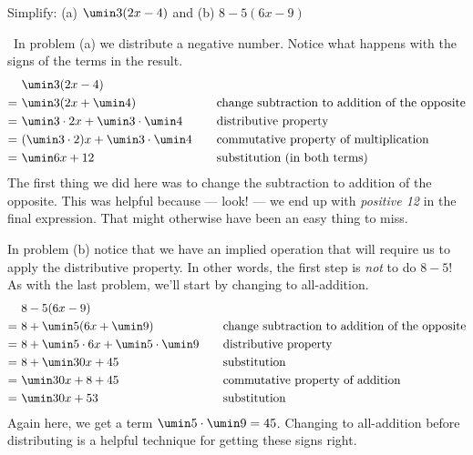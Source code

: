 \begin{boxedex}
Simplify: (a) $\umin3(2x - 4)$ \quad and \quad (b) $8-5(6x-9)$

\exsoln\ In problem (a) we distribute a negative number. Notice what happens with the signs of the terms in the result.
\[\begin{aligned}
&~ \umin3(2x - 4)&&\\
=&~ \umin3(2x + \umin4)
&& \quad \text{change subtraction to addition of the opposite}\\
=&~ \umin3 \cdot 2x + \umin3 \cdot \umin4
&& \quad \text{distributive property}\\
=&~ (\umin3 \cdot 2)x + \umin3 \cdot \umin4
&& \quad \text{commutative property of multiplication}\\
=&~ \umin6x + 12
&& \quad \text{substitution (in both terms)}\\
\end{aligned}\]
The first thing we did here was to change the subtraction to addition of the opposite. This was helpful because --- look! --- we end up with \textit{positive 12} in the final expression. That might otherwise have been an easy thing to miss.

In problem (b) notice that we have an implied operation that will require us to apply the distributive property. In other words, the first step is \textit{not} to do $8-5$! As with the last problem, we'll start by changing to all-addition.
\[\begin{aligned}
&~ 8-5(6x-9)&&\\
=&~ 8+\umin5(6x + \umin9)
&& \quad \text{change subtraction to addition of the opposite}\\
=&~ 8 + \umin5\cdot6x + \umin5\cdot\umin9
&& \quad \text{distributive property}\\
=&~ 8 + \umin30x + 45
&& \quad \text{substitution}\\
=&~ \umin30x + 8 + 45
&& \quad \text{commutative property of addition}\\
=&~ \umin30x + 53
&& \quad \text{substitution}\\
\end{aligned}\]
Again here, we get a term $\umin5\cdot\umin9 = 45$. Changing to all-addition before distributing is a helpful technique for getting these signs right.
\end{boxedex}

